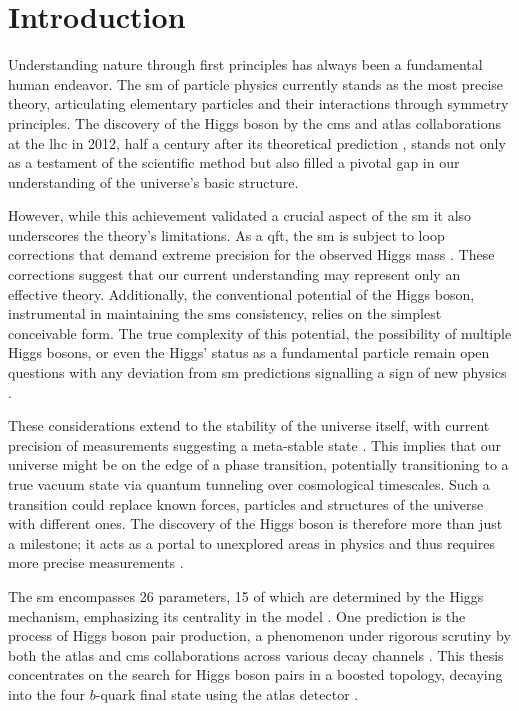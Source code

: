 \chapter{Introduction}
Understanding nature through first principles has always been a fundamental human endeavor. The \ac{sm} of particle physics currently stands as the most precise theory, articulating elementary particles and their interactions through symmetry principles. The discovery of the Higgs boson by the \ac{cms} \citep{higgs-cms} and \ac{atlas} \citep{higgs} collaborations at the \ac{lhc} in 2012, half a century after its theoretical prediction \citep{PhysRevLett.13.321,PhysRevLett.13.508}, stands not only as a testament of the scientific method but also filled a pivotal gap in our understanding of the universe's basic structure.

However, while this achievement validated a crucial aspect of the \ac{sm} it also underscores the  theory's limitations. As a \ac{qft}, the \ac{sm} is subject to loop corrections that demand extreme precision for the observed Higgs mass \citep{peskin2016trail}. These corrections suggest that our current understanding may represent only an effective theory. Additionally, the conventional potential of the Higgs boson, instrumental in maintaining the \acp{sm} consistency, relies on the simplest conceivable form. The true complexity of this potential, the possibility of multiple Higgs bosons, or even the Higgs' status as a fundamental particle remain open questions with any deviation from \ac{sm} predictions signalling a sign of new physics \citep{PhysRevD.101.075023}. 

These considerations extend to the stability of the universe itself, with current precision of measurements suggesting a meta-stable state \citep{Buttazzo:2013uya}. This implies that our universe might be on the edge of a phase transition, potentially transitioning to a true vacuum state via quantum tunneling over cosmological timescales. Such a transition could replace known forces, particles and structures of the universe with different ones. The discovery of the Higgs boson is therefore more than just a milestone; it acts as a portal to unexplored areas in physics and thus requires more precise measurements \citep{dawsona2022report}.

The \ac{sm} encompasses 26 parameters, 15 of which are determined by the Higgs mechanism, emphasizing its centrality in the model \citep{thomson2013modern}. One prediction is the process of Higgs boson pair production, a phenomenon under rigorous scrutiny by both the \ac{atlas} and \ac{cms} collaborations across various decay channels \citep{GOUZEVITCH2020100039}. This thesis concentrates on the search for Higgs boson pairs in a boosted topology, decaying into the four $b$-quark final state using the \ac{atlas} detector \citep{atlas2018search}.

